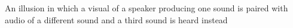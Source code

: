 An illusion in which a visual of a speaker producing one sound is paired with audio of a different sound and a third sound is heard instead
